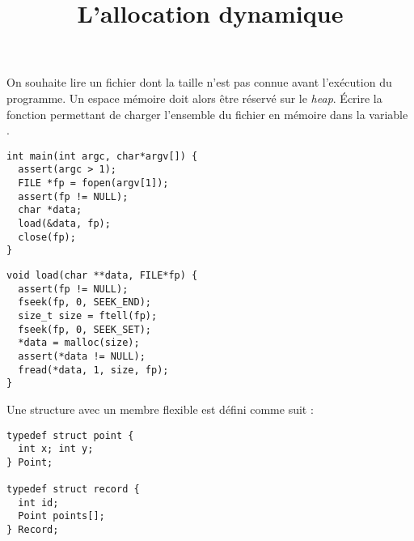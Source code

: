 \documentclass[french,a4paper,addpoints,11pt]{exam}
\title{L'allocation dynamique}
\begin{document}
\maketitle

\ifprintanswers
\else
\begin{multicols}{2}
\fi
\begin{questions}

\question
On souhaite lire un fichier dont la taille n'est pas connue avant l'exécution du programme. Un espace mémoire doit alors être réservé sur le \emph{heap}. Écrire la fonction  permettant de charger l'ensemble du fichier en mémoire dans la variable .

\begin{lstlisting}
int main(int argc, char*argv[]) {
  assert(argc > 1);
  FILE *fp = fopen(argv[1]);
  assert(fp != NULL);
  char *data;
  load(&data, fp);
  close(fp);
}
\end{lstlisting}

\begin{solution}
\begin{lstlisting}
void load(char **data, FILE*fp) {
  assert(fp != NULL);
  fseek(fp, 0, SEEK_END);
  size_t size = ftell(fp);
  fseek(fp, 0, SEEK_SET);
  *data = malloc(size);
  assert(*data != NULL);
  fread(*data, 1, size, fp);
}
\end{lstlisting}
\end{solution}

\question
Une structure avec un membre flexible est défini comme suit :

\begin{lstlisting}
typedef struct point {
  int x; int y;
} Point;

typedef struct record {
  int id;
  Point points[];
} Record;
\end{lstlisting}

\end{questions}
\end{multicols}
\end{document}
